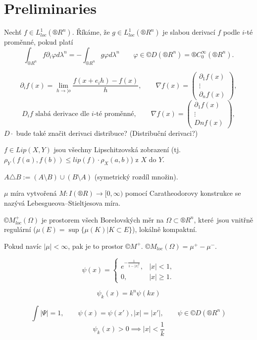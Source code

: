 \documentclass[12pt]{article}					%
\begin{document}

\section{Preliminaries}
\begin{definice}
	Nechť $f \in L^1_{loc}(®R^n)$. Říkáme, že $g \in L^1_{loc}(®R^n)$ je slabou derivací $f$ podle $i$-té proměnné, pokud platí
	$$ \int_{®R^n} f \partial_i φ dλ^n = - \int_{®R^n} g φ dλ^n \qquad φ \in ©D(®R^n) = ®C^∞_0(®R^n). $$
\end{definice}

\begin{definice}[Značení]
	$$ \partial_i f(x) = \lim_{h \rightarrow ¦o} \frac{f(x + e_i h) - f(x)}{h}, \qquad \nabla f(x) = \begin{pmatrix} \partial_1f(x) \\ \vdots\\ \partial_n f(x) \end{pmatrix}, $$
	$$ D_if \text{ slabá derivace dle $i$-té proměnné}, \qquad \nabla f(x) = \begin{pmatrix} \partial_1f(x) \\ \vdots\\ Dn f(x) \end{pmatrix}, $$
	$D·$ bude také značit derivaci distribuce? (Distribuční derivaci?)

	$f \in Lip(X, Y)$ jsou všechny Lipschitzovská zobrazení (tj. $ρ_Y(f(a), f(b)) ≤ lip(f)·ρ_X(a, b)$) z $X$ do $Y$.

	$A \triangle B := (A \setminus B) \cup (B \setminus A)$ (symetrický rozdíl množin).
\end{definice}

\begin{definice}
	$μ$ míra vytvořená $M: I(®R) \rightarrow [0, ∞)$ pomocí Caratheodorovy konstrukce se nazývá Lebesgueova–Stieltjesova míra.
\end{definice}

\begin{definice}
	$©M^+_{loc}(Ω)$ je prostorem všech Borelovských měr na $Ω \subset ®R^n$, které jsou vnitřně regulární ($μ(E) = \sup\{\mu(K) | K \subset E\}$), lokálně kompaktní.

	Pokud navíc $|μ| < ∞$, pak je to prostor $©M^+$. $©M_{loc}(Ω) = μ^+ - μ^-$.
\end{definice}

\begin{definice}[?]
	$$ ψ(x) = \begin{cases}e^{-\frac{1}{1 - |x|^2}}, & |x| < 1,\\ 0, & |x| ≥ 1.\end{cases} $$

	$$ ψ_k(x) = k^n ψ(kx) $$

	\begin{poznamkain}
		$$\int |Ψ| = 1, \qquad ψ(x) = ψ(x'), |x| = |x'|, \qquad ψ \in ©D(®R^n) $$
		$$ ψ_k(x) > 0 \implies |x| < \frac{1}{k} $$
	\end{poznamkain}
\end{definice}
\end{document}
